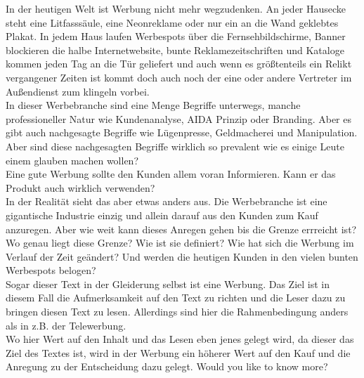 \begin{refsection}
  
  
  In der heutigen Welt ist Werbung nicht mehr wegzudenken. An jeder Hausecke steht eine Litfasssäule, eine Neonreklame oder nur ein an die Wand geklebtes Plakat. In jedem Haus laufen Werbespots über die Fernsehbildschirme, Banner blockieren die halbe Internetwebsite, bunte Reklamezeitschriften und Kataloge kommen jeden Tag an die Tür geliefert und auch wenn es grö\ss{}tenteils ein Relikt vergangener Zeiten ist kommt doch auch noch der eine oder andere Vertreter im Au\ss{}endienst zum klingeln vorbei.\\
  In dieser Werbebranche sind eine Menge Begriffe unterwegs, manche professioneller Natur wie Kundenanalyse, AIDA Prinzip oder Branding. Aber es gibt auch nachgesagte Begriffe wie Lügenpresse, Geldmacherei und Manipulation. Aber sind diese nachgesagten Begriffe wirklich so prevalent wie es einige Leute einem glauben machen wollen?\\
  Eine gute Werbung sollte den Kunden allem voran Informieren. Kann er das Produkt auch wirklich verwenden?\\

  In der Realität sieht das aber etwas anders aus. Die Werbebranche ist eine gigantische Industrie einzig und allein darauf aus den Kunden zum Kauf anzuregen. Aber wie weit kann dieses Anregen gehen bis die Grenze errreicht ist? Wo genau liegt diese Grenze? Wie ist sie definiert? Wie hat sich die Werbung im Verlauf der Zeit geändert? Und werden die heutigen Kunden in den vielen bunten Werbespots belogen?\\
  Sogar dieser Text in der Gleiderung selbst ist eine Werbung. Das Ziel ist in diesem Fall die Aufmerksamkeit auf den Text zu richten und die Leser dazu zu bringen diesen Text zu lesen. Allerdings sind hier die Rahmenbedingung anders als in z.B. der Telewerbung.\\
  Wo hier Wert auf den Inhalt und das Lesen eben jenes gelegt wird, da dieser das Ziel des Textes ist, wird in der Werbung ein höherer Wert auf den Kauf und die Anregung zu der Entscheidung dazu gelegt. Would you like to know more?
  \clearpage
  \printbibliography[heading=subsubbibliography]
\end{refsection}
\clearpage
